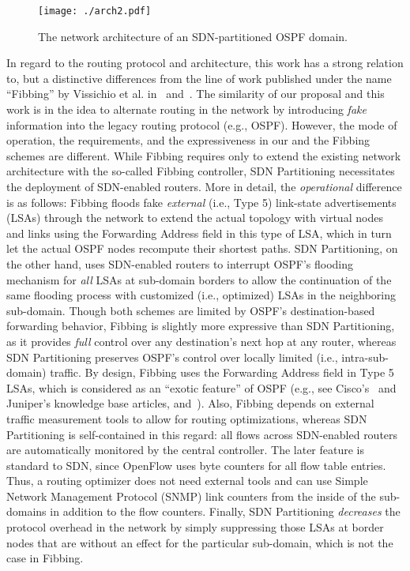 \documentclass[journal]{IEEEtran}
\begin{document}
\begin{figure*}[t] \center
\texttt{[image: ./arch2.pdf]}
\caption{The network architecture of an SDN-partitioned OSPF domain.}
\label{arch} \end{figure*}


\par In regard to the routing protocol and architecture, this work has a strong relation to, but a distinctive differences from the line of work published under the name ``Fibbing'' by Vissichio et al. in~\cite{fibbing1} and~\cite{fibbing2}. The similarity of our proposal and this work is in the idea to alternate routing in the network by introducing \emph{fake} information into the legacy routing protocol (e.g., OSPF). However, the mode of operation, the requirements, and the expressiveness in our and the Fibbing schemes are different. While Fibbing requires only to extend the existing network architecture with the so-called Fibbing controller, SDN Partitioning necessitates the deployment of SDN-enabled routers. More in detail, the \emph{operational} difference is as follows: Fibbing floods fake \emph{external} (i.e., Type 5) link-state advertisements (LSAs) through the network to extend the actual topology with virtual nodes and links using the Forwarding Address field in this type of LSA, which in turn let the actual OSPF nodes recompute their shortest paths. SDN Partitioning, on the other hand, uses SDN-enabled routers to interrupt OSPF's flooding mechanism for \emph{all} LSAs at sub-domain borders to allow the continuation of the same flooding process with customized (i.e., optimized) LSAs in the neighboring sub-domain. Though both schemes are limited by OSPF's destination-based forwarding behavior, Fibbing is slightly more expressive than SDN Partitioning, as it provides \emph{full} control over any destination's next hop at any router, whereas SDN Partitioning preserves OSPF's control over locally limited (i.e., intra-sub-domain) traffic. By design, Fibbing uses the Forwarding Address field in Type 5 LSAs, which is considered as an ``exotic feature'' of OSPF (e.g., see Cisco's~\cite{ciscoproblem} and Juniper's\cite{juniperproblem} knowledge base articles, and~\cite{OSPFforwardingaddress}). Also, Fibbing depends on external traffic measurement tools to allow for routing optimizations, whereas SDN Partitioning is self-contained in this regard: all flows across SDN-enabled routers are automatically monitored by the central controller. The later feature is standard to SDN, since OpenFlow uses byte counters for all flow table entries. Thus, a routing optimizer does not need external tools and can use Simple Network Management Protocol (SNMP) link counters from the inside of the sub-domains in addition to the flow counters. Finally, SDN Partitioning \emph{decreases} the protocol overhead in the network by simply suppressing those LSAs at border nodes that are without an effect for the particular sub-domain, which is not the case in Fibbing.
\end{document}
